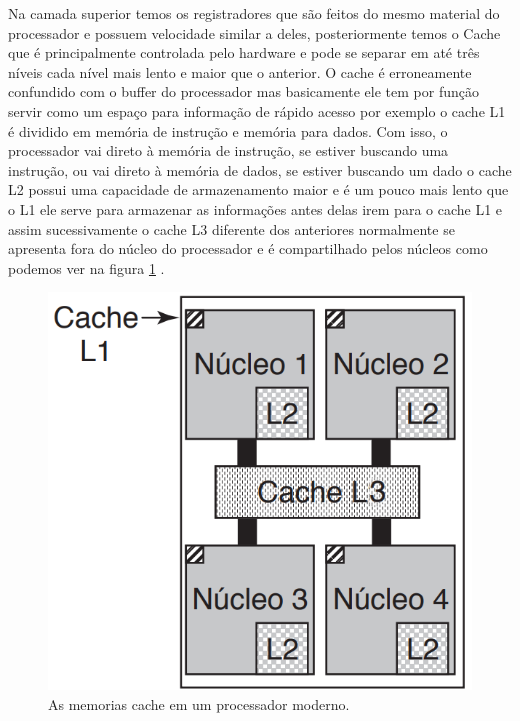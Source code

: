 Na camada superior temos os registradores que são feitos do mesmo material do processador e possuem velocidade similar a deles, posteriormente temos o Cache que é principalmente controlada pelo hardware e pode se separar em até  três níveis cada nível  mais lento e maior que o anterior. O cache é erroneamente confundido com o buffer do processador mas basicamente ele tem por função servir como um espaço para informação de rápido acesso por exemplo  o cache L1 é dividido em memória de instrução e memória para dados. Com isso, o processador vai direto à memória de instrução, se estiver buscando uma instrução, ou vai direto à memória de dados, se estiver buscando um dado o cache L2 possui uma capacidade de armazenamento maior e é um pouco mais lento que o L1 ele serve para armazenar as informações antes delas irem para o cache L1 e assim sucessivamente o cache L3 diferente dos anteriores normalmente se apresenta fora do núcleo do processador e é compartilhado pelos núcleos como podemos ver na figura \ref{fig:cache} .
\begin{figure}[htpb]
    \centering
   \includegraphics[scale=0.4]{imagens/cache.png}
   \caption{As memorias cache em um processador moderno.}
   \label{fig:cache}
\end{figure}\\

